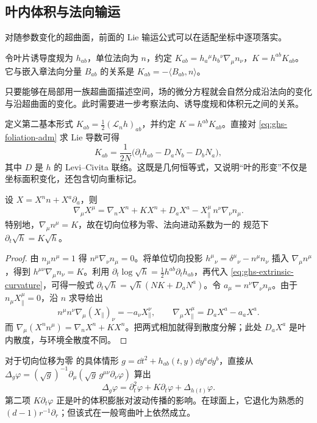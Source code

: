 \subsection{叶内体积与法向输运}

对随参数变化的超曲面，前面的 Lie 输运公式可以在适配坐标中逐项落实。

令叶片诱导度规为 $h_{ab}$，单位法向为 $n$，约定 $K_{ab}=h_a{}^\mu h_b{}^\nu\nabla_\mu n_\nu$，$K=h^{ab}K_{ab}$。它与嵌入章法向分量 $B_{ab}$ 的关系是 $K_{ab}=-\langle B_{ab},n\rangle$。

只要能够在局部用一族超曲面描述空间，场的微分方程就会自然分成沿法向的变化与沿超曲面的变化。此时需要进一步考察法向、诱导度规和体积元之间的关系。

定义第二基本形式 $K_{ab}=\frac12(\mathcal L_n h)_{ab}$，并约定 $K=h^{ab}K_{ab}$。直接对 \cref{eq:ghs-foliation-adm} 求 Lie 导数可得
\begin{equation}\label{eq:ghs-extrinsic-curvature}
 K_{ab}=\frac1{2N}\bigl(\partial_t h_{ab}-D_aN_b-D_bN_a\bigr),
\end{equation}
其中 $D$ 是 $h$ 的 Levi--Civita 联络。这既是几何恒等式，又说明“叶的形变”不仅是坐标面积变化，还包含切向重标记。

\begin{proposition}[法向体积变化]
设 $X=X^n n+X^a\partial_a$，则
\[
 \nabla_\mu X^\mu=\nabla_nX^n+K X^n+D_aX^a
 - X^\mu_{\parallel}\,n^\nu\nabla_\nu n_\mu.
\]
特别地，$\nabla_\mu n^\mu=K$，故在切向位移为零、法向进动系数为一的 规范下 $\partial_t\sqrt h=K\sqrt h$。
\end{proposition}
\begin{proof}
由 $n_\mu n^\mu=1$ 得 $n^\mu\nabla_\nu n_\mu=0$。将单位切向投影 $h^\mu{}_{\nu}=\delta^\mu{}_\nu-n^\mu n_\nu$ 插入 $\nabla_\mu n^\mu$，得到 $h^{\mu\nu}\nabla_\mu n_\nu=K$。利用 $\partial_t\log\sqrt h=\frac12h^{ab}\partial_t h_{ab}$，再代入 \cref{eq:ghs-extrinsic-curvature}，可得一般式 $\partial_t\sqrt h=\sqrt h(NK+D_aN^a)$。令 $a_\mu=n^\nu\nabla_\nu n_\mu$。由于 $n_\mu X^\mu_\parallel=0$，沿 $n$ 求导给出
\[
 n^\mu n^\nu\nabla_\mu(X_\parallel)_\nu=-a_\nu X^\nu_\parallel,
 \qquad \nabla_\mu X^\mu_\parallel=D_aX^a-a_aX^a.
\]
而 $\nabla_\mu(X^nn^\mu)=\nabla_nX^n+KX^n$。把两式相加就得到散度分解；此处 $D_aX^a$ 是叶内散度，与环境全散度不同。
\end{proof}

对于切向位移为零 的具体情形 $g=\dd t^2+h_{ab}(t,y)\dd y^a\dd y^b$，直接从
$\Delta_g\varphi=(\sqrt g)^{-1}\partial_\mu(\sqrt g\,g^{\mu\nu}\partial_\nu\varphi)$ 算出
\begin{equation}\label{eq:ghs-laplace-evolving-slices}
 \Delta_g\varphi=\partial_t^2\varphi+K\partial_t\varphi+\Delta_{h(t)}\varphi.
\end{equation}
第二项 $K\partial_t\varphi$ 正是叶的体积膨胀对波动传播的影响。在球面上，它退化为熟悉的 $(d-1)r^{-1}\partial_r$；但该式在一般弯曲叶上依然成立。

